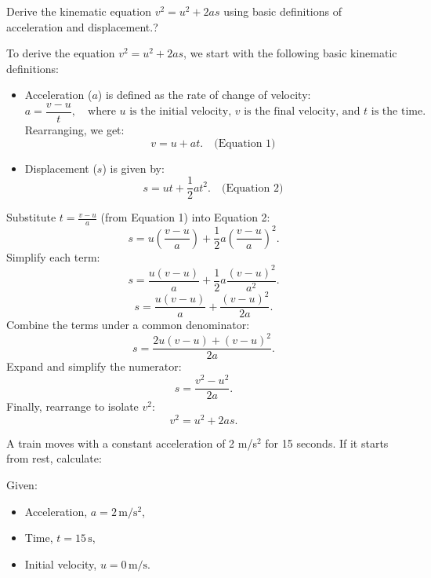 \documentclass[addpoints]{exam}
\begin{document}
\begin{questions}
\question[5] Derive the kinematic equation $v^2 = u^2 + 2as$ using basic definitions of acceleration and displacement.?
\begin{solution}[6cm]
    To derive the equation \(v^2 = u^2 + 2as\), we start with the following basic kinematic definitions:
\begin{itemize}
    \item Acceleration (\(a\)) is defined as the rate of change of velocity:
    \[
    a = \frac{v - u}{t}, \quad \text{where } u \text{ is the initial velocity, } v \text{ is the final velocity, and } t \text{ is the time.}
    \]
    Rearranging, we get:
    \[    v = u + at. \quad \text{(Equation 1)}\]
    \item Displacement (\(s\)) is given by:
    \[    s = ut + \frac{1}{2}at^2. \quad \text{(Equation 2)}\]
\end{itemize}
Substitute \(t = \frac{v - u}{a}\) (from Equation 1) into Equation 2:
\[
s = u\left(\frac{v - u}{a}\right) + \frac{1}{2}a\left(\frac{v - u}{a}\right)^2.
\]
Simplify each term:
\[
s = \frac{u(v - u)}{a} + \frac{1}{2}a\frac{(v - u)^2}{a^2}.
\]
\[s = \frac{u(v - u)}{a} + \frac{(v - u)^2}{2a}.\]
Combine the terms under a common denominator:
\[s = \frac{2u(v - u) + (v - u)^2}{2a}.\]
Expand and simplify the numerator:
\[s = \frac{v^2 - u^2}{2a}.\]
Finally, rearrange to isolate \(v^2\):
\[v^2 = u^2 + 2as.\]
\end{solution}



\question A train moves with a constant acceleration of 2 m/s$^2$ for 15 seconds. If it starts from rest, calculate:
\begin{solution}[5cm]
    Given:
\begin{itemize}
    \item Acceleration, \(a = 2 \, \mathrm{m/s^2}\),
    \item Time, \(t = 15 \, \mathrm{s}\),
    \item Initial velocity, \(u = 0 \, \mathrm{m/s}\).
\end{itemize}


\end{solution}
\end{questions}
\end{document}
